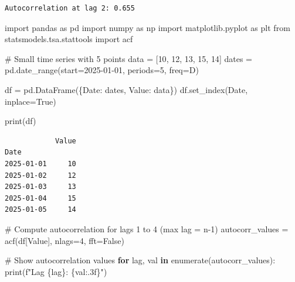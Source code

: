 \documentclass[
  11pt,
  a4paper,
]{report}
\newenvironment{Shaded}{\begin{snugshade}}{\end{snugshade}}
\newcommand{\BuiltInTok}[1]{\textcolor[rgb]{0.00,0.23,0.31}{#1}}
\newcommand{\CommentTok}[1]{\textcolor[rgb]{0.37,0.37,0.37}{#1}}
\newcommand{\ControlFlowTok}[1]{\textcolor[rgb]{0.00,0.23,0.31}{\textbf{#1}}}
\newcommand{\DecValTok}[1]{\textcolor[rgb]{0.68,0.00,0.00}{#1}}
\newcommand{\ImportTok}[1]{\textcolor[rgb]{0.00,0.46,0.62}{#1}}
\newcommand{\KeywordTok}[1]{\textcolor[rgb]{0.00,0.23,0.31}{\textbf{#1}}}
\newcommand{\NormalTok}[1]{\textcolor[rgb]{0.00,0.23,0.31}{#1}}
\newcommand{\OperatorTok}[1]{\textcolor[rgb]{0.37,0.37,0.37}{#1}}
\newcommand{\SpecialCharTok}[1]{\textcolor[rgb]{0.37,0.37,0.37}{#1}}
\newcommand{\SpecialStringTok}[1]{\textcolor[rgb]{0.13,0.47,0.30}{#1}}
\newcommand{\StringTok}[1]{\textcolor[rgb]{0.13,0.47,0.30}{#1}}
\newcommand{\VariableTok}[1]{\textcolor[rgb]{0.07,0.07,0.07}{#1}}
\begin{document}
\begin{verbatim}
Autocorrelation at lag 2: 0.655
\end{verbatim}

\begin{Shaded}
\begin{Highlighting}[]
\ImportTok{import}\NormalTok{ pandas }\ImportTok{as}\NormalTok{ pd}
\ImportTok{import}\NormalTok{ numpy }\ImportTok{as}\NormalTok{ np}
\ImportTok{import}\NormalTok{ matplotlib.pyplot }\ImportTok{as}\NormalTok{ plt}
\ImportTok{from}\NormalTok{ statsmodels.tsa.stattools }\ImportTok{import}\NormalTok{ acf}

\CommentTok{\# Small time series with 5 points}
\NormalTok{data }\OperatorTok{=}\NormalTok{ [}\DecValTok{10}\NormalTok{, }\DecValTok{12}\NormalTok{, }\DecValTok{13}\NormalTok{, }\DecValTok{15}\NormalTok{, }\DecValTok{14}\NormalTok{]}
\NormalTok{dates }\OperatorTok{=}\NormalTok{ pd.date\_range(start}\OperatorTok{=}\StringTok{\textquotesingle{}2025{-}01{-}01\textquotesingle{}}\NormalTok{, periods}\OperatorTok{=}\DecValTok{5}\NormalTok{, freq}\OperatorTok{=}\StringTok{\textquotesingle{}D\textquotesingle{}}\NormalTok{)}

\NormalTok{df }\OperatorTok{=}\NormalTok{ pd.DataFrame(\{}\StringTok{\textquotesingle{}Date\textquotesingle{}}\NormalTok{: dates, }\StringTok{\textquotesingle{}Value\textquotesingle{}}\NormalTok{: data\})}
\NormalTok{df.set\_index(}\StringTok{\textquotesingle{}Date\textquotesingle{}}\NormalTok{, inplace}\OperatorTok{=}\VariableTok{True}\NormalTok{)}

\BuiltInTok{print}\NormalTok{(df)}
\end{Highlighting}
\end{Shaded}

\begin{verbatim}
            Value
Date             
2025-01-01     10
2025-01-02     12
2025-01-03     13
2025-01-04     15
2025-01-05     14
\end{verbatim}

\begin{Shaded}
\begin{Highlighting}[]
\CommentTok{\# Compute autocorrelation for lags 1 to 4 (max lag = n{-}1)}
\NormalTok{autocorr\_values }\OperatorTok{=}\NormalTok{ acf(df[}\StringTok{\textquotesingle{}Value\textquotesingle{}}\NormalTok{], nlags}\OperatorTok{=}\DecValTok{4}\NormalTok{, fft}\OperatorTok{=}\VariableTok{False}\NormalTok{)}

\CommentTok{\# Show autocorrelation values}
\ControlFlowTok{for}\NormalTok{ lag, val }\KeywordTok{in} \BuiltInTok{enumerate}\NormalTok{(autocorr\_values):}
    \BuiltInTok{print}\NormalTok{(}\SpecialStringTok{f"Lag }\SpecialCharTok{\{}\NormalTok{lag}\SpecialCharTok{\}}\SpecialStringTok{: }\SpecialCharTok{\{}\NormalTok{val}\SpecialCharTok{:.3f\}}\SpecialStringTok{"}\NormalTok{)}
\end{Highlighting}
\end{Shaded}
\end{document}
